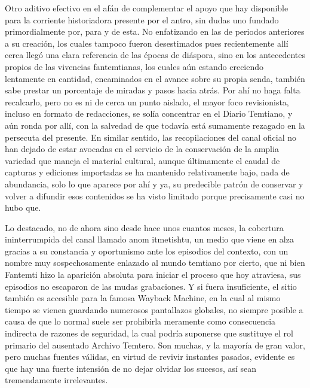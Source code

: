 \documentclass[
]{book}
\begin{document}
Otro aditivo efectivo en el afán de complementar el apoyo que hay disponible para la corriente historiadora presente por el antro, sin dudas uno fundado primordialmente por, para y de esta. No enfatizando en las de periodos anteriores a su creación, los cuales tampoco fueron desestimados pues recientemente allí cerca llegó una clara referencia de las épocas de diáspora, sino en los antecedentes propios de las vivencias fantemtianas, los cuales aún estando creciendo lentamente en cantidad, encaminados en el avance sobre su propia senda, también sabe prestar un porcentaje de miradas y pasos hacia atrás. Por ahí no haga falta recalcarlo, pero no es ni de cerca un punto aislado, el mayor foco revisionista, incluso en formato de redacciones, se solía concentrar en el Diario Temtiano, y aún ronda por allí, con la salvedad de que todavía está sumamente rezagado en la persecuta del presente. En similar sentido, las recopilaciones del canal oficial no han dejado de estar avocadas en el servicio de la conservación de la amplia variedad que maneja el material cultural, aunque últimamente el caudal de capturas y ediciones importadas se ha mantenido relativamente bajo, nada de abundancia, solo lo que aparece por ahí y ya, su predecible patrón de conservar y volver a difundir esos contenidos se ha visto limitado porque precisamente casi no hubo que.

Lo destacado, no de ahora sino desde hace unos cuantos meses, la cobertura ininterrumpida del canal llamado anom itmetishtu, un medio que viene en alza gracias a su constancia y oportunismo ante los episodios del contexto, con un nombre muy sospechosamente enlazado al mundo temtiano por cierto, que ni bien Fantemti hizo la aparición absoluta para iniciar el proceso que hoy atraviesa, sus episodios no escaparon de las mudas grabaciones. Y si fuera insuficiente, el sitio también es accesible para la famosa Wayback Machine, en la cual al mismo tiempo se vienen guardando numerosos pantallazos globales, no siempre posible a causa de que lo normal suele ser prohibirla meramente como consecuencia indirecta de razones de seguridad, la cual podría suponerse que sustituye el rol primario del ausentado Archivo Temtero. Son muchas, y la mayoría de gran valor, pero muchas fuentes válidas, en virtud de revivir instantes pasados, evidente es que hay una fuerte intensión de no dejar olvidar los sucesos, así sean tremendamente irrelevantes.
\end{document}
